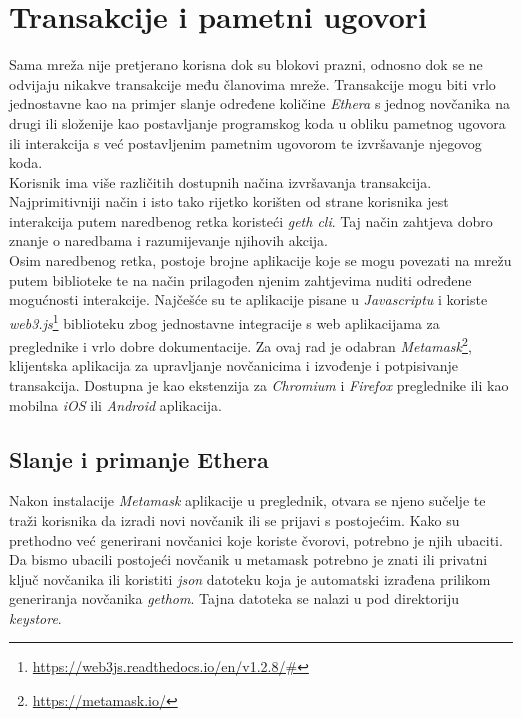 \documentclass[times, utf8, zavrsni, numeric]{fer}
\begin{document}
\section{Transakcije i pametni ugovori}
Sama mreža nije pretjerano korisna dok su blokovi prazni, odnosno dok se ne odvijaju nikakve transakcije među članovima mreže. Transakcije mogu biti vrlo jednostavne
kao na primjer slanje određene količine \emph{Ethera} s jednog novčanika na drugi ili složenije kao postavljanje programskog koda u obliku pametnog ugovora ili interakcija
s već postavljenim pametnim ugovorom te izvršavanje njegovog koda. \\
Korisnik ima više različitih dostupnih načina izvršavanja transakcija. Najprimitivniji način i isto tako rijetko korišten od strane korisnika jest interakcija putem
naredbenog retka koristeći \emph{geth cli}. Taj način zahtjeva dobro znanje o naredbama i razumijevanje njihovih akcija. \\
Osim naredbenog retka, postoje brojne aplikacije koje se mogu povezati na mrežu putem biblioteke te na način prilagođen njenim zahtjevima nuditi određene mogućnosti
interakcije. Najčešće su te aplikacije pisane u \emph{Javascriptu} i koriste \emph{web3.js}\footnote{\url{https://web3js.readthedocs.io/en/v1.2.8/#}} biblioteku zbog
jednostavne integracije s web aplikacijama za preglednike i vrlo dobre dokumentacije.
Za ovaj rad je odabran \emph{Metamask}\footnote{\url{https://metamask.io/}}, klijentska aplikacija za upravljanje novčanicima i izvođenje i potpisivanje transakcija. 
Dostupna je kao ekstenzija za \emph{Chromium} i \emph{Firefox} preglednike ili kao mobilna \emph{iOS} ili \emph{Android} aplikacija. 
\subsection{Slanje i primanje Ethera}
Nakon instalacije \emph{Metamask} aplikacije u preglednik, otvara se njeno sučelje te traži korisnika da izradi novi novčanik ili se prijavi s postojećim.
Kako su prethodno već generirani novčanici koje koriste čvorovi, potrebno je njih ubaciti. Da bismo ubacili postojeći novčanik u metamask potrebno je znati ili
privatni ključ novčanika ili koristiti \emph{json} datoteku koja je automatski izrađena prilikom generiranja novčanika \emph{gethom}. Tajna datoteka se nalazi
u pod direktoriju \emph{keystore}.
\end{document}
